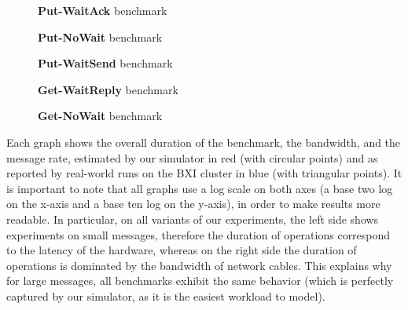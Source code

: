 \begin{figure}[!h]
    \centering
    \caption{\textbf{Put-WaitAck} benchmark}
    \label{fig:4_portals:ptlput_waitack}
\end{figure}

\begin{figure}[!b]
    \centering
    \caption{\textbf{Put-NoWait} benchmark}
    \label{fig:4_portals:ptlput_nowait}
\end{figure}

\begin{figure}[!b]
    \centering
    \caption{\textbf{Put-WaitSend} benchmark}
    \label{fig:4_portals:ptlput_waitsend}
\end{figure}

\begin{figure}[!b]
    \centering
    \caption{\textbf{Get-WaitReply} benchmark}
    \label{fig:4_portals:ptlget_waitreply}
\end{figure}

\begin{figure}[!h]
    \centering
    \caption{\textbf{Get-NoWait} benchmark}
    \label{fig:4_portals:ptlget_nowait}
\end{figure}

Each graph shows the overall duration of the benchmark, the bandwidth, and the
message rate, estimated by our simulator in red (with circular points) and as
reported by real-world runs on the BXI cluster in blue (with triangular points).
It is important to note that all graphs use a log scale on both axes (a base two
log on the x-axis and a base ten log on the y-axis), in order to make results
more readable. In particular, on all variants of our experiments, the left side
shows experiments on small messages, therefore the duration of operations
correspond to the latency of the hardware, whereas on the right side the
duration of operations is dominated by the bandwidth of network cables. This
explains why for large messages, all benchmarks exhibit the same behavior (which
is perfectly captured by our simulator, as it is the easiest workload to model).

